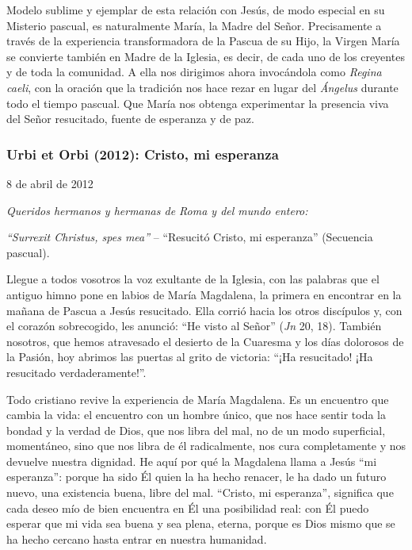 			\begin{body}Modelo sublime y ejemplar de esta relación con Jesús, de modo especial en su Misterio pascual, es naturalmente María, la Madre del Señor. Precisamente a través de la experiencia transformadora de la Pascua de su Hijo, la Virgen María se convierte también en Madre de la Iglesia, es decir, de cada uno de los creyentes y de toda la comunidad. A ella nos dirigimos ahora invocándola como \textit{Regina caeli}, con la oración que la tradición nos hace rezar en lugar del \textit{Ángelus} durante todo el tiempo pascual. Que María nos obtenga experimentar la presencia viva del Señor resucitado, fuente de esperanza y de paz.\end{body}
			
			\subsubsection{Urbi et Orbi (2012): Cristo, mi esperanza}
			
			\begin{referencia}8 de abril de 2012\end{referencia}
			
			\begin{body}\textit{Queridos hermanos y hermanas de Roma y del mundo entero: }\end{body}
			
			\begin{body}\textit{“Surrexit Christus, spes mea” }– “Resucitó Cristo, mi esperanza” (Secuencia pascual). \end{body}
			
			\begin{body}Llegue a todos vosotros la voz exultante de la Iglesia, con las palabras que el antiguo himno pone en labios de María Magdalena, la primera en encontrar en la mañana de Pascua a Jesús resucitado. Ella corrió hacia los otros discípulos y, con el corazón sobrecogido, les anunció: “He visto al Señor” (\textit{Jn} 20, 18). También nosotros, que hemos atravesado el desierto de la Cuaresma y los días dolorosos de la Pasión, hoy abrimos las puertas al grito de victoria: “¡Ha resucitado! ¡Ha resucitado verdaderamente!”.\end{body}
			
			\begin{body}Todo cristiano revive la experiencia de María Magdalena. Es un encuentro que cambia la vida: el encuentro con un hombre único, que nos hace sentir toda la bondad y la verdad de Dios, que nos libra del mal, no de un modo superficial, momentáneo, sino que nos libra de él radicalmente, nos cura completamente y nos devuelve nuestra dignidad. He aquí por qué la Magdalena llama a Jesús “mi esperanza”: porque ha sido Él quien la ha hecho renacer, le ha dado un futuro nuevo, una existencia buena, libre del mal. “Cristo, mi esperanza”, significa que cada deseo mío de bien encuentra en Él una posibilidad real: con Él puedo esperar que mi vida sea buena y sea plena, eterna, porque es Dios mismo que se ha hecho cercano hasta entrar en nuestra humanidad. \end{body}
			
